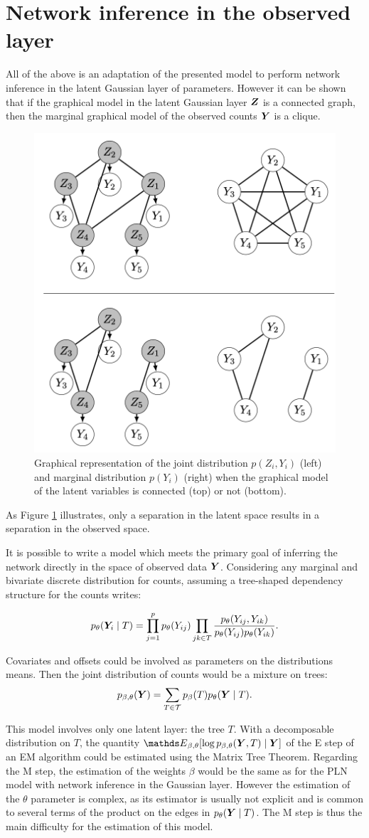 
\section{Network inference in the observed layer}
All of the above is an adaptation of the presented model to perform network inference in the latent Gaussian layer of parameters.
 However it can be shown that if the graphical model in the latent Gaussian layer ${\boldsymbol{Z}}$ is a connected graph, then the marginal graphical model of the observed counts ${\boldsymbol{Y}}$ is a clique. 
\begin{figure}[H]
\centering
\includegraphics[width=0.5\linewidth]{figs/YZ.png}
\caption{Graphical representation of the joint distribution $p(Z_i,Y_i)$ (left) and marginal distribution $p(Y_i)$ (right) when the graphical model of the latent variables is connected (top) or not (bottom).}
\label{YZ}
\end{figure}
As Figure \ref{YZ} illustrates, only a separation in the latent space results in a separation in the observed space.


It is possible to write a model which meets the primary goal of inferring  the network directly in the space of observed data ${\boldsymbol{Y}}$. Considering any marginal and bivariate discrete distribution for counts, assuming a tree-shaped dependency structure for the counts writes: %

 $$p_\theta({\boldsymbol{Y}}_i \mid T) = \prod_{j=1}^p p_\theta(Y_{ij}) \prod_{jk\in T} \frac{p_\theta(Y_{ij},Y_{ik})}{p_\theta(Y_{ij})p_\theta(Y_{ik})}.$$
 
Covariates and offsets could be involved as parameters on the distributions means. Then the joint distribution of counts would be a mixture on trees:
$$p_{\beta, \theta}({\boldsymbol{Y}} ) = \sum_{T\in \mathcal{T}} p_\beta(T)p_\theta({\boldsymbol{Y}}\mid T).$$

This model involves only one latent layer: the tree $T$. With a decomposable distribution on $T$, the quantity $\Esp_{\beta, \theta}[\log p_{\beta, \theta}(\Ybf, T)\mid\Ybf]$ of the E step of an EM algorithm could be estimated using the Matrix Tree Theorem. Regarding the M step, the estimation of the weights $\beta$  would be the same as for the PLN model with network inference in the Gaussian layer. However the estimation of the $\theta$ parameter is complex, as its estimator is usually not explicit and is common to several terms of the product on the edges in $p_\theta({\boldsymbol{Y}}\mid T)$. The M step is thus the main difficulty for the estimation of this model.
